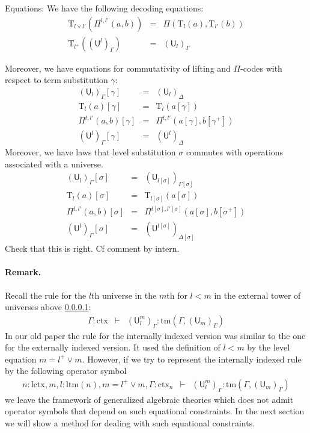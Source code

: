 \documentclass[11pt,a4paper]{article}
\theoremstyle{definition}
\newcommand{\UU}{\mathsf{U}}
\def\UU{\mathsf{U}}
\newcommand{\N}{\mathsf{N}}
\def\lctx{\mathrm{lctx}}
\def\ltm{\mathrm{ltm}}
\newcommand{\ctx}{\mathrm{ctx}}
\newcommand{\tm}{\mathrm{tm}}
\def\U{\mathsf{U}}
\newcommand{\Ta}{\mathrm{T}}
\begin{document}
Equations:
We have the following decoding equations:
\begin{eqnarray*}
\Ta_{l \vee l'}(\Pi^{l,l'}(a,b)) &=& \Pi(\Ta_l(a),\Ta_{l'}(b))\\
\Ta_{l^+}((\UU^l)_\Gamma) &=& (\UU_l)_\Gamma 
\end{eqnarray*}

Moreover, we have equations for commutativity of lifting and $\Pi$-codes with respect to term substitution $\gamma$:
 \begin{eqnarray*}
(\U_l)_\Gamma [ \gamma ] &=& (\U_l)_\Delta\\
\Ta_l(a) [ \gamma ] &=& \Ta_l(a[ \gamma ] )\\
\Pi^{l,l'}(a,b)[ \gamma ] &=& \Pi^{l,l'}(a [ \gamma ], b[ \gamma^+ ])\\
(\UU^l)_\Gamma[ \gamma ] &=&(\UU^l)_\Delta
\end{eqnarray*}
Moreover, we have laws that level substitution $\sigma$ commutes with operations associated with a universe.
 \begin{eqnarray*}
 (\U_{l})_\Gamma[\sigma] &=& (\U_{l[\sigma]})_{\Gamma[\sigma]}\\
 \Ta_l(a) [ \sigma ] &=& \Ta_{l[\sigma]}(a[ \sigma ] )\\
\Pi^{l,l'}(a,b)[ \sigma ] &=& \Pi^{l[ \sigma ] ,l'[ \sigma ] }(a [ \sigma ], b[ \sigma^+ ])\\
(\UU^l)_\Gamma[ \sigma ] &=&(\UU^{l[ \sigma ]} )_{\Delta[ \sigma ]} 
 \end{eqnarray*}
Check that this is right. Cf comment by intern.

\paragraph{Remark.} Recall the rule for the $l$th universe in the $m$th for $l < m$ in the external tower of universes above \ref{}: 
\begin{eqnarray*}
\Gamma : \ctx&\vdash&(\UU^m_l)_\Gamma: \tm(\Gamma,(\UU_{m})_\Gamma)
\end{eqnarray*}
In our old paper the rule for the internally indexed version was similar to the one for the externally indexed version. It used the definition of $l < m$ by the level equation $m = l^+ \vee m$. However, if we try to represent the internally indexed rule by the following operator symbol
\begin{eqnarray*}
n : \lctx, m, l : \ltm(n), m = l^+ \vee m, \Gamma : \ctx_n &\vdash&(\UU^m_l)_\Gamma: \tm(\Gamma,(\UU_{m})_\Gamma)
\end{eqnarray*}
we leave the framework of generalized algebraic theories which does not admit operator symbols that depend on such equational constraints. In the next section we will show a method for dealing with such equational constraints.
\end{document}
